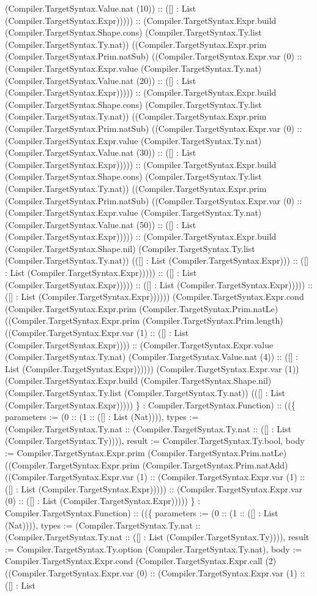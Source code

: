 \documentclass[11pt]{article}
\begin{document}
(Compiler.TargetSyntax.Value.nat (10)) :: ([] : List (Compiler.TargetSyntax.Expr))))) :: (Compiler.TargetSyntax.Expr.build (Compiler.TargetSyntax.Shape.cons) (Compiler.TargetSyntax.Ty.list (Compiler.TargetSyntax.Ty.nat)) ((Compiler.TargetSyntax.Expr.prim (Compiler.TargetSyntax.Prim.natSub) ((Compiler.TargetSyntax.Expr.var (0) :: (Compiler.TargetSyntax.Expr.value (Compiler.TargetSyntax.Ty.nat) (Compiler.TargetSyntax.Value.nat (20)) :: ([] : List (Compiler.TargetSyntax.Expr))))) :: (Compiler.TargetSyntax.Expr.build (Compiler.TargetSyntax.Shape.cons) (Compiler.TargetSyntax.Ty.list (Compiler.TargetSyntax.Ty.nat)) ((Compiler.TargetSyntax.Expr.prim (Compiler.TargetSyntax.Prim.natSub) ((Compiler.TargetSyntax.Expr.var (0) :: (Compiler.TargetSyntax.Expr.value (Compiler.TargetSyntax.Ty.nat) (Compiler.TargetSyntax.Value.nat (30)) :: ([] : List (Compiler.TargetSyntax.Expr))))) :: (Compiler.TargetSyntax.Expr.build (Compiler.TargetSyntax.Shape.cons) (Compiler.TargetSyntax.Ty.list (Compiler.TargetSyntax.Ty.nat)) ((Compiler.TargetSyntax.Expr.prim (Compiler.TargetSyntax.Prim.natSub) ((Compiler.TargetSyntax.Expr.var (0) :: (Compiler.TargetSyntax.Expr.value (Compiler.TargetSyntax.Ty.nat) (Compiler.TargetSyntax.Value.nat (50)) :: ([] : List (Compiler.TargetSyntax.Expr))))) :: (Compiler.TargetSyntax.Expr.build (Compiler.TargetSyntax.Shape.nil) (Compiler.TargetSyntax.Ty.list (Compiler.TargetSyntax.Ty.nat)) (([] : List (Compiler.TargetSyntax.Expr))) :: ([] : List (Compiler.TargetSyntax.Expr))))) :: ([] : List (Compiler.TargetSyntax.Expr))))) :: ([] : List (Compiler.TargetSyntax.Expr))))) :: ([] : List (Compiler.TargetSyntax.Expr)))))) (Compiler.TargetSyntax.Expr.cond (Compiler.TargetSyntax.Expr.prim (Compiler.TargetSyntax.Prim.natLe) ((Compiler.TargetSyntax.Expr.prim (Compiler.TargetSyntax.Prim.length) ((Compiler.TargetSyntax.Expr.var (1) :: ([] : List (Compiler.TargetSyntax.Expr)))) :: (Compiler.TargetSyntax.Expr.value (Compiler.TargetSyntax.Ty.nat) (Compiler.TargetSyntax.Value.nat (4)) :: ([] : List (Compiler.TargetSyntax.Expr)))))) (Compiler.TargetSyntax.Expr.var (1)) (Compiler.TargetSyntax.Expr.build (Compiler.TargetSyntax.Shape.nil) (Compiler.TargetSyntax.Ty.list (Compiler.TargetSyntax.Ty.nat)) (([] : List (Compiler.TargetSyntax.Expr))))) \} : Compiler.TargetSyntax.Function) :: ((\{ parameters := (0 :: (1 :: ([] : List (Nat)))), types := (Compiler.TargetSyntax.Ty.nat :: (Compiler.TargetSyntax.Ty.nat :: ([] : List (Compiler.TargetSyntax.Ty)))), result := Compiler.TargetSyntax.Ty.bool, body := Compiler.TargetSyntax.Expr.prim (Compiler.TargetSyntax.Prim.natLe) ((Compiler.TargetSyntax.Expr.prim (Compiler.TargetSyntax.Prim.natAdd) ((Compiler.TargetSyntax.Expr.var (1) :: (Compiler.TargetSyntax.Expr.var (1) :: ([] : List (Compiler.TargetSyntax.Expr))))) :: (Compiler.TargetSyntax.Expr.var (0) :: ([] : List (Compiler.TargetSyntax.Expr))))) \} : Compiler.TargetSyntax.Function) :: ((\{ parameters := (0 :: (1 :: ([] : List (Nat)))), types := (Compiler.TargetSyntax.Ty.nat :: (Compiler.TargetSyntax.Ty.nat :: ([] : List (Compiler.TargetSyntax.Ty)))), result := Compiler.TargetSyntax.Ty.option (Compiler.TargetSyntax.Ty.nat), body := Compiler.TargetSyntax.Expr.cond (Compiler.TargetSyntax.Expr.call (2) ((Compiler.TargetSyntax.Expr.var (0) :: (Compiler.TargetSyntax.Expr.var (1) :: ([] : List 
\end{document}
